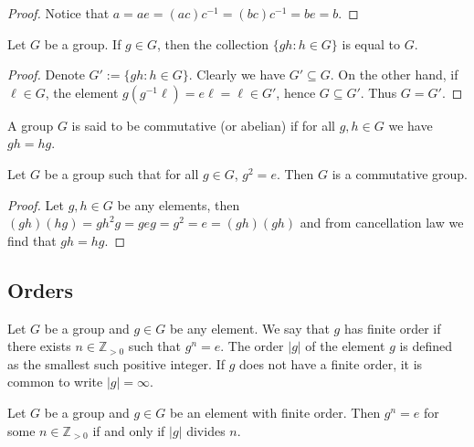 \begin{proof}
  Notice that \(a = a e = (a c) c^{-1} = (b c) c^{-1} = b e = b\).
\end{proof}

\begin{proposition}
  Let \(G\) be a group. If \(g \in G\), then the collection \(\{g h: h \in G\}\)
  is equal to \(G\).
\end{proposition}

\begin{proof}
  Denote \(G' := \{g h: h \in G\}\). Clearly we have \(G' \subseteq G\). On the
  other hand, if \(\ell \in G\), the element \(g (g^{-1} \ell) = e \ell = \ell
  \in G'\), hence \(G \subseteq G'\). Thus \(G = G'\).
\end{proof}

\begin{definition}
  A group \(G\) is said to be commutative (or abelian) if for all \(g, h \in G\)
  we have \(g h = h g\).
\end{definition}

\begin{corollary}
  Let \(G\) be a group such that for all \(g \in G\), \(g^2 = e\). Then \(G\) is
  a commutative group.
\end{corollary}

\begin{proof}
  Let \(g, h \in G\) be any elements, then \((g h) (h g) = g h^2 g = g e g = g^2
  = e = (g h) (g h)\) and from cancellation law we find that \(g h = h g\).
\end{proof}

\subsection{Orders}

\begin{definition}\label{def: group elem order}
  Let \(G\) be a group and \(g \in G\) be any element. We say that \(g\) has
  finite order if there exists \(n \in \mathbb{Z}_{> 0}\) such that \(g^n = e\).
  The order \(|g|\) of the element \(g\) is defined as the smallest such
  positive integer. If \(g\) does not have a finite order, it is common to write
   \(|g| = \infty\).
\end{definition}

\begin{lemma}\label{lem: order and multiples}
  Let \(G\) be a group and \(g \in G\) be an element with finite order. Then
  \(g^n = e\) for some \(n \in \mathbb{Z}_{> 0}\) if and only if \(|g|\) divides
  \(n\).
\end{lemma}

